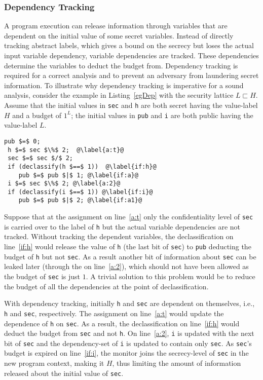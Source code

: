 \subsubsection{\textbf{Dependency Tracking}}
\label{aspect:dt} 
A program execution can release information through variables that are
dependent on the initial value of some secret variables. Instead of
directly tracking abstract labels, which gives a bound on the secrecy
but loses the actual input variable dependency, variable dependencies
are tracked. These dependencies determine the  variables to deduct the
budget from. Dependency tracking is required for a correct analysis 
and to prevent an adversary from laundering secret information. To
illustrate why dependency tracking is imperative for a sound
analysis, consider the example in Listing~\ref{egDep} with the 
security lattice $L \sqsubset H$. Assume that the initial values in
\texttt{sec} and \texttt{h} are both secret having the value-label $H$ 
and a budget of $1^L$; the initial values in \texttt{pub} and
\texttt{i} are both public having the value-label $L$.

\begin{lstlisting}[float,caption=Leak due to dependent variables, label=egDep]
 pub $=$ 0;
 h $=$ sec $\%$ 2;  @\label{a:t}@
 sec $=$ sec $/$ 2;
 if (declassify(h $==$ 1))  @\label{if:h}@
    pub $=$ pub $|$ 1; @\label{if:a}@
 i $=$ sec $\%$ 2; @\label{a:2}@
 if (declassify(i $==$ 1)) @\label{if:i}@
    pub $=$ pub $|$ 2; @\label{if:a1}@
\end{lstlisting}

Suppose that at the assignment on line~\ref{a:t} only the
confidentiality level of \texttt{sec} is carried over to the label of
\texttt{h} but the actual variable dependencies are not tracked.
Without tracking the dependent variables, the declassification on
line~\ref{if:h} would release the value of \texttt{h} (the last bit of
\texttt{sec}) to \texttt{pub} deducting the budget of \texttt{h} but
not \texttt{sec}. As a result another bit of information about
\texttt{sec} can be leaked later (through the  on
line~\ref{a:2}), which should not have been allowed as the budget of
\texttt{sec} is just $1$. A trivial solution to this problem would be
to reduce the budget of all the dependencies at the point of
declassification. 

With dependency tracking, initially \texttt{h} and \texttt{sec} are 
dependent on themselves, i.e., \texttt{h} and \texttt{sec},
respectively. The assignment on line~\ref{a:t} would update the
dependence of \texttt{h} on \texttt{sec}. As a result, the
declassification on line~\ref{if:h} would deduct the budget from
\texttt{sec} and not \texttt{h}. On line~\ref{a:2}, \texttt{i} is
updated with the next bit of \texttt{sec} and the dependency-set of
\texttt{i} is updated to contain only \texttt{sec}. As \texttt{sec}'s
budget is expired on line~\ref{if:i}, the monitor joins the
secrecy-level of \texttt{sec} in the new program context, making it
$H$, thus limiting the amount of information released about 
the initial value of \texttt{sec}.  

